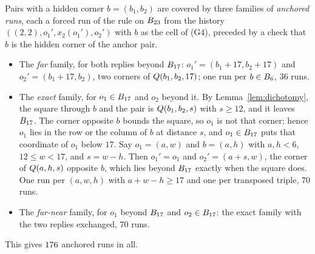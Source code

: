 \documentclass[11pt]{amsart}
\theoremstyle{definition}
\theoremstyle{remark}
\begin{document}
Pairs with a hidden corner $b = (b_1, b_2)$ are covered by three
families of \emph{anchored runs}, each a forced run of the rule on
$B_{23}$ from the history $((2,2), o_1', x_2(o_1'), o_2')$ with
$b$ as the cell of (G4), preceded by a check that $b$ is the hidden
corner of the anchor pair.
\begin{itemize}
\item The \emph{far} family, for both replies beyond $B_{17}$:
  $o_1' = (b_1 + 17, b_2 + 17)$ and $o_2' = (b_1 + 17, b_2)$, two
  corners of $Q(b_1, b_2, 17)$; one run per $b \in B_6$, $36$
  runs.
\item The \emph{exact} family, for $o_1 \in B_{17}$ and $o_2$
  beyond it. By Lemma~\ref{lem:dichotomy}, the square through $b$ and
  the pair is $Q(b_1, b_2, s)$ with $s \ge 12$, and it leaves
  $B_{17}$. The corner opposite $b$ bounds the square, so $o_1$ is
  not that corner; hence $o_1$ lies in the row or the column of $b$ at
  distance $s$, and $o_1 \in B_{17}$ puts that coordinate of $o_1$
  below $17$. Say $o_1 = (a, w)$ and $b = (a, h)$ with $a, h < 6$,
  $12 \le w < 17$, and $s = w - h$. Then $o_1' = o_1$ and
  $o_2' = (a + s, w)$, the corner of $Q(a, h, s)$ opposite $b$, which
  lies beyond $B_{17}$ exactly when the square does. One run per
  $(a, w, h)$ with $a + w - h \ge 17$ and one per transposed triple,
  $70$ runs.
\item The \emph{far-near} family, for $o_1$ beyond $B_{17}$ and
  $o_2 \in B_{17}$: the exact family with the two replies
  exchanged, $70$ runs.
\end{itemize}
This gives $176$ anchored runs in all.
\end{document}

